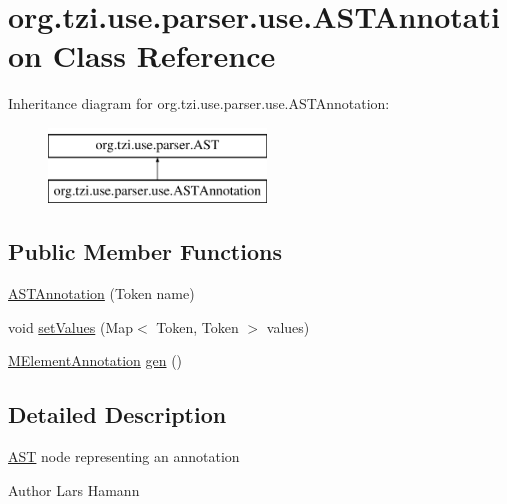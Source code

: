 \hypertarget{classorg_1_1tzi_1_1use_1_1parser_1_1use_1_1_a_s_t_annotation}{\section{org.\-tzi.\-use.\-parser.\-use.\-A\-S\-T\-Annotation Class Reference}
\label{classorg_1_1tzi_1_1use_1_1parser_1_1use_1_1_a_s_t_annotation}
}
Inheritance diagram for org.\-tzi.\-use.\-parser.\-use.\-A\-S\-T\-Annotation\-:\begin{figure}[H]
\begin{center}
\leavevmode
\includegraphics[height=2.000000cm]{classorg_1_1tzi_1_1use_1_1parser_1_1use_1_1_a_s_t_annotation}
\end{center}
\end{figure}
\subsection*{Public Member Functions}
\begin{DoxyCompactItemize}
\item 
\hyperlink{classorg_1_1tzi_1_1use_1_1parser_1_1use_1_1_a_s_t_annotation_a4faef6f2501396deb3069ed421663ae7}{A\-S\-T\-Annotation} (Token name)
\item 
void \hyperlink{classorg_1_1tzi_1_1use_1_1parser_1_1use_1_1_a_s_t_annotation_ae31c914c2257df70876132b8ae0d17d0}{set\-Values} (Map$<$ Token, Token $>$ values)
\item 
\hyperlink{classorg_1_1tzi_1_1use_1_1uml_1_1mm_1_1_m_element_annotation}{M\-Element\-Annotation} \hyperlink{classorg_1_1tzi_1_1use_1_1parser_1_1use_1_1_a_s_t_annotation_a8292aa2545680f7e45e5f97e468a9f81}{gen} ()
\end{DoxyCompactItemize}


\subsection{Detailed Description}
\hyperlink{classorg_1_1tzi_1_1use_1_1parser_1_1_a_s_t}{A\-S\-T} node representing an annotation \begin{DoxyAuthor}{Author}
Lars Hamann 
\end{DoxyAuthor}


